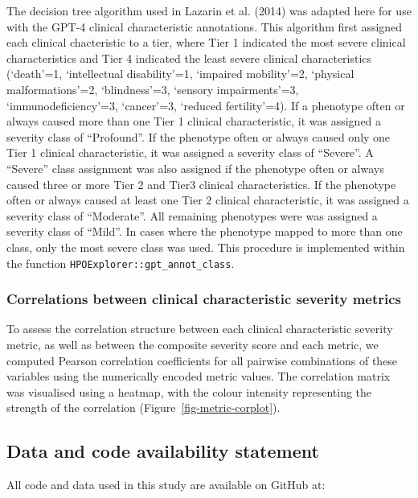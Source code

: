 \documentclass[
]{agujournal2019}
\begin{document}
The decision tree algorithm used in Lazarin et al. (2014) was adapted
here for use with the GPT-4 clinical characteristic annotations. This
algorithm first assigned each clinical chacteristic to a tier, where
Tier 1 indicated the most severe clinical characteristics and Tier 4
indicated the least severe clinical characteristics (`death'=1,
`intellectual disability'=1, `impaired mobility'=2, `physical
malformations'=2, `blindness'=3, `sensory impairments'=3,
`immunodeficiency'=3, `cancer'=3, `reduced fertility'=4). If a phenotype
often or always caused more than one Tier 1 clinical characteristic, it
was assigned a severity class of ``Profound''. If the phenotype often or
always caused only one Tier 1 clinical characteristic, it was assigned a
severity class of ``Severe''. A ``Severe'' class assignment was also
assigned if the phenotype often or always caused three or more Tier 2
and Tier3 clinical characteristics. If the phenotype often or always
caused at least one Tier 2 clinical characteristic, it was assigned a
severity class of ``Moderate''. All remaining phenotypes were was
assigned a severity class of ``Mild''. In cases where the phenotype
mapped to more than one class, only the most severe class was used. This
procedure is implemented within the function
\texttt{HPOExplorer::gpt\_annot\_class}.

\subsubsection{Correlations between clinical characteristic severity
metrics}\label{correlations-between-clinical-characteristic-severity-metrics-1}

To assess the correlation structure between each clinical characteristic
severity metric, as well as between the composite severity score and
each metric, we computed Pearson correlation coefficients for all
pairwise combinations of these variables using the numerically encoded
metric values. The correlation matrix was visualised using a heatmap,
with the colour intensity representing the strength of the correlation
(Figure~\ref{fig-metric-corplot}).

\subsection{Data and code availability
statement}\label{data-and-code-availability-statement}

All code and data used in this study are available on GitHub at:
\end{document}
